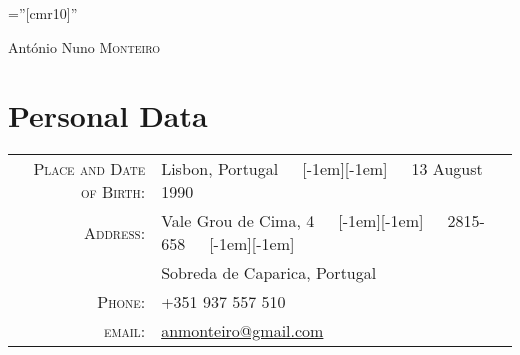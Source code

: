 \documentclass[a4paper,10pt]{article}
\newcommand*\bull{\raisebox{-0.365em}[-1em][-1em]{\textscale{4}{$\cdot$}}}
\newcommand*\sbull{\ \ \bull \ \ }
\begin{document}

\pagestyle{empty} %

\font\fb=''[cmr10]'' %

\par{\centering
		{\Huge António Nuno \textsc{Monteiro}
	}\bigskip\par}

\section{Personal Data}

\begin{tabular}{rl}
    \textsc{Place and Date of Birth:} & Lisbon, Portugal~\sbull~13 August 1990 \\
    \textsc{Address:}   & Vale Grou de Cima, 4~\sbull~2815-658~\sbull~\\
    & Sobreda de Caparica, Portugal \\
    \textsc{Phone:}     & +351 937 557 510\\
    \textsc{email:}     & \href{mailto:anmonteiro@gmail.com}{anmonteiro@gmail.com}
\end{tabular}

\end{document}
